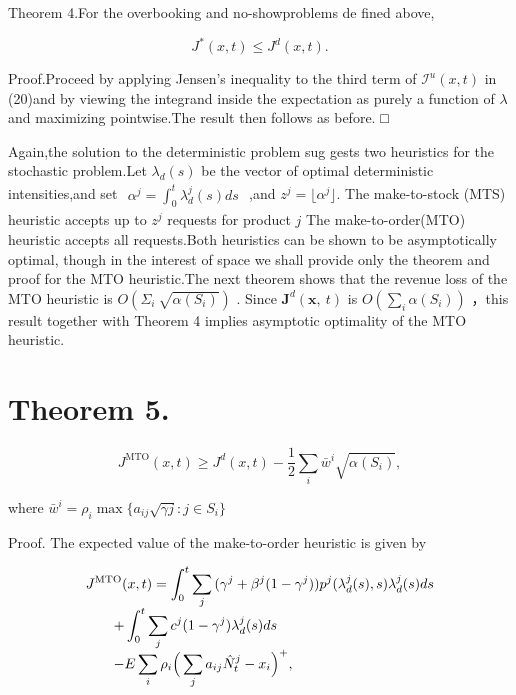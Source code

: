 Theorem 4.For the overbooking and no-showproblems de fined above,

\[
J ^ { * } ( x , t ) \leqslant J ^ { d } ( x , t ) .
\]

Proof.Proceed by applying Jensen's inequality to the third term of
\(\mathcal { I } ^ { u } ( x , t )\) in (20)and by viewing the integrand
inside the expectation as purely a function of \(\lambda\) and
maximizing pointwise.The result then follows as before. □

Again,the solution to the deterministic problem sug gests two heuristics
for the stochastic problem.Let \(\lambda _ { d } ( s )\) be the vector
of optimal deterministic intensities,and set
\(\begin{array} { r } { \alpha ^ { j } = \int _ { 0 } ^ { t } \lambda _ { d } ^ { j } ( s ) d s } \end{array}\)
,and \(z ^ { j } = \lfloor \alpha ^ { j } \rfloor .\) The make-to-stock
(MTS) heuristic accepts up to \(z ^ { j }\) requests for product \(j\)
The make-to-order(MTO) heuristic accepts all requests.Both heuristics
can be shown to be asymptotically optimal, though in the interest of
space we shall provide only the theorem and proof for the MTO
heuristic.The next theorem shows that the revenue loss of the MTO
heuristic is \(O ( \Sigma _ { i } \ \sqrt { \alpha ( S _ { i } ) } )\) .
Since \(\boldsymbol { J } ^ { d } ( \boldsymbol { x } , \ t )\) is
\(O ( \sum _ { i } \alpha ( S _ { i } ) )\) ，this result together with
Theorem 4 implies asymptotic optimality of the MTO heuristic.

\section{Theorem 5.}\label{theorem-5.}

\[
J ^ { \mathrm { M T O } } ( x , t ) \geqslant J ^ { d } ( x , t ) - \frac { 1 } { 2 } \sum _ { i } \bar { w } ^ { i } \sqrt { \alpha ( S _ { i } ) } ,
\]

where
\(\bar { w } ^ { i } = \rho _ { i } \operatorname* { m a x } \{ a _ { i j } \sqrt { \gamma j } \colon j \in S _ { i } \}\)

Proof. The expected value of the make-to-order heuristic is given by

\[
\begin{array} { l l l } { \displaystyle { J ^ { \mathrm { M T O } } ( x , t ) = \int _ { 0 } ^ { t } \sum _ { j } { ( \gamma ^ { j } + \beta ^ { j } ( 1 - \gamma ^ { j } ) ) p ^ { j } ( \lambda _ { d } ^ { j } ( s ) , s ) \lambda _ { d } ^ { j } ( s ) d s } } } \\ { \displaystyle { \quad \quad + \int _ { 0 } ^ { t } \sum _ { j } { c ^ { j } ( 1 - \gamma ^ { j } ) \lambda _ { d } ^ { j } ( s ) d s } } } \\ { \displaystyle { \quad \quad - E \sum _ { i } { \rho _ { i } \Big ( \sum _ { j } { a _ { i j } \hat { N } _ { t } ^ { j } - x _ { i } } \Big ) ^ { + } } , } } \end{array}
\]

